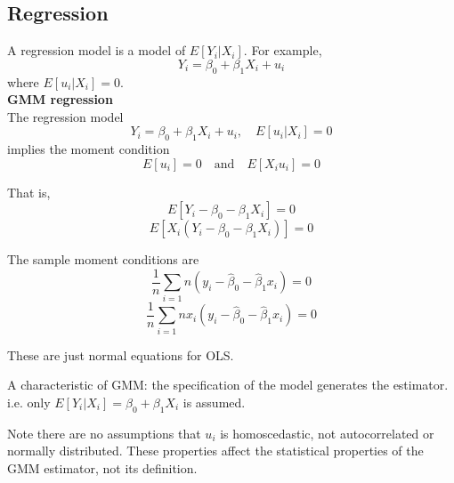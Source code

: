 \subsection{Regression}

A regression model is a model of $E[Y_i|X_i]$.  For example,
\begin{equation}
Y_i=\beta_0+\beta_1X_i+u_i
\end{equation}
where $E[u_i|X_i]=0$.\\

{\bf GMM regression}\\

The regression model
\begin{equation}
Y_i=\beta_0+\beta_1X_i+u_i, \quad E[u_i|X_i]=0
\end{equation}
implies the moment condition
\begin{equation}
E[u_i]=0 \quad  \mbox{and} \quad  E[X_i u_i]=0
\end{equation}

That is,
\begin{equation}
E[Y_i-\beta_0-\beta_1X_i]=0
\end{equation}
\begin{equation}
E[X_i(Y_i-\beta_0-\beta_1X_i)]=0
\end{equation}

The sample moment conditions are
\begin{equation}
\frac{1}{n}\sum_{i=1}{n}(y_i-\hat \beta_0-\hat \beta_1x_i)=0
\end{equation}
\begin{equation}
\frac{1}{n}\sum_{i=1}{n}x_i(y_i-\hat \beta_0-\hat \beta_1x_i)=0
\end{equation}

These are just normal equations for OLS.

A characteristic of GMM:  the specification of the model generates
the estimator.  i.e. only $E[Y_i|X_i]=\beta_0+\beta_1 X_i$ is
assumed.

Note there are no assumptions that $u_i$ is homoscedastic, not
autocorrelated or normally distributed.  These properties affect
the statistical properties of the GMM estimator, not its
definition.
